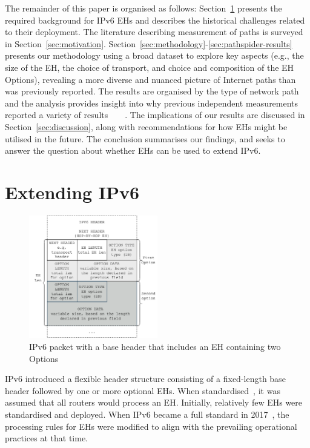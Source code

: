 \documentclass[conference]{IEEEtran}
\begin{document}
The remainder of this paper is organised as follows:
Section~\ref{sec:background} presents the required background for IPv6 EHs and
describes the historical challenges related to their deployment.  The
literature describing measurement of paths is surveyed in
Section~\ref{sec:motivation}.
Section~\ref{sec:methodology}-\ref{sec:pathspider-results} presents our
methodology using a broad dataset to explore key aspects (e.g., the size of the
EH, the choice of transport, and choice and composition of the EH Options),
revealing a more diverse and nuanced picture of Internet paths than was
previously reported. The results are organised by the type of network path and
the analysis provides insight into why previous independent measurements
reported a variety of results~\cite{RFC7872}~\cite{apnic}~\cite{nalini-iepg114}~\cite{james}.  The implications of our results are
discussed in Section~\ref{sec:discussion}, along with recommendations for how
EHs might be utilised in the future.  The conclusion summarises our
findings, and seeks to answer the question about whether EHs can be used to
extend IPv6.


\section{Extending IPv6}
\label{sec:background}


\label{sec:ipv6-option-deployment}

\begin{figure}
\centering
  \includegraphics[width=0.5\textwidth]{ehformat.png}
  \caption{IPv6 packet with a base header that includes an EH containing two Options}
  \label{fig:eh-format}
\end{figure}

IPv6 introduced a flexible header structure
consisting of a fixed-length base header followed by one or more optional EHs.
When standardised~\cite{rfc2460}, it was assumed that all routers would process an EH.
Initially, relatively few EHs were standardised and deployed.  When IPv6
became a full standard in 2017~\cite{rfc8200}, the processing rules for EHs were
modified to align with the prevailing operational practices at that time.
\end{document}
